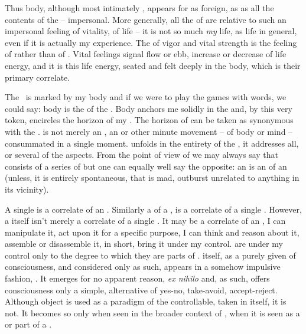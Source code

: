 Thus body, although most intimately , appears for  as foreign, as  as all the contents of the
   -- impersonal. 
More generally, all the  of  are relative to such an
  impersonal feeling of vitality, of life -- it is not so much {\em my} life, 
as life in general, even if it is actually my experience. The 
 of vigor and vital strength is the feeling of  rather than of . Vital feelings signal flow 
or ebb, increase or decrease of life energy, and it is this life 
energy, seated and felt deeply in the body, which is their primary correlate. 


\pa
The \hoa\ is marked by my body and if we were to play the games with words, we
could say: body is the  of the \hoa.  Body anchors me solidly in the
 and, by this very token, encircles the horizon of my .
The horizon of  can be taken as synonymous with the \hoa.
 is not merely an , an   or other
minute movement -- of body or mind -- consummated in a single moment. 
unfolds in the entirety of the \hoa, it addresses all, or several of the 
aspects. From the point of view of  we may always say
that  consists of a series of  but one can equally well say
the opposite: an  is an  of an  (unless, it is 
entirely spontaneous, that is mad, outburst unrelated to anything in its vicinity).

A single  is a correlate of an . Similarly a  of a
, is a correlate of a single . However, a 
itself isn't merely a correlate of a single . It may be a correlate of
an , I can manipulate it, act upon it for a specific purpose, I can
think and reason about it, assemble or disassemble it, in short, bring it under
my control.   are under my control only to the degree to which they
are parts of .  itself, as a purely  given
of consciousness, and considered only as such, appears in a somehow impulsive
fashion, .
It emerges for no apparent reason, {\em ex nihilo} and, as such, offers
consciousness only a simple,  alternative of yes-no, take-avoid,
accept-reject. Although object is used as a paradigm of the controllable, taken
in itself, it is not. It becomes so only when seen in the broader context of
, when it is seen as a  or part of a .

